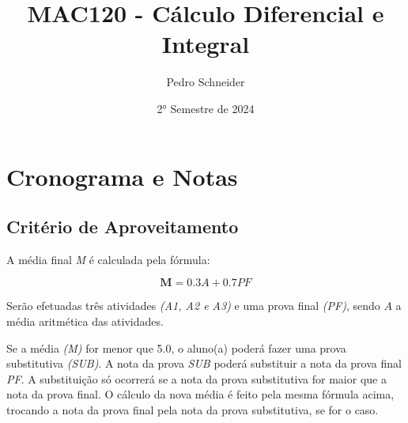 \documentclass[12pt]{article}
\title{MAC120 - Cálculo Diferencial e Integral}
\author{Pedro Schneider}
\date{2° Semestre de 2024}
\begin{document}
\maketitle

\section{Cronograma e Notas}

\subsection{Critério de Aproveitamento}
A média final \textit{M} é calculada pela fórmula:

\begin{center}
    \[
    \bm{M} = 0.3A + 0.7PF
    \]
\end{center}

\noindent
Serão efetuadas três atividades \textit{(A1, A2 e A3)} e uma prova final \textit{(PF)}, sendo $A$ a média aritmética das atividades.

\noindent
Se a média \textit{(M)} for menor que 5.0, o aluno(a) poderá fazer uma prova substitutiva \textit{(SUB)}.
A nota da prova \textit{SUB} poderá substituir a nota da prova final \textit{PF}.
A substituição só ocorrerá se a nota da prova substitutiva for maior que a nota da prova final.
O cálculo da nova média é feito pela mesma fórmula acima, trocando a nota da prova final pela nota da prova substitutiva, se for o caso.

\renewcommand{\arraystretch}{1.25} %
\end{document}

